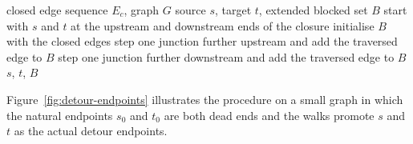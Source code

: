 \begin{algorithm}[H]
\caption{\textsc{FindDetourEndpoints}}
\label{alg:find-endpoints}
\begin{algorithmic}[1]
\Require closed edge sequence $E_c$, graph $G$
\Ensure source $s$, target $t$, extended blocked set $B$
\State start with $s$ and $t$ at the upstream and downstream ends of the closure
\State initialise $B$ with the closed edges
  \State step one junction further upstream and add the traversed edge to $B$
\EndWhile
{}
  \State step one junction further downstream and add the traversed edge to $B$
\EndWhile
\State \Return $s$, $t$, $B$
\end{algorithmic}
\end{algorithm}

Figure~\ref{fig:detour-endpoints} illustrates the procedure on a small graph
in which the natural endpoints $s_0$ and $t_0$ are both dead ends and the
walks promote $s$ and $t$ as the actual detour endpoints.

